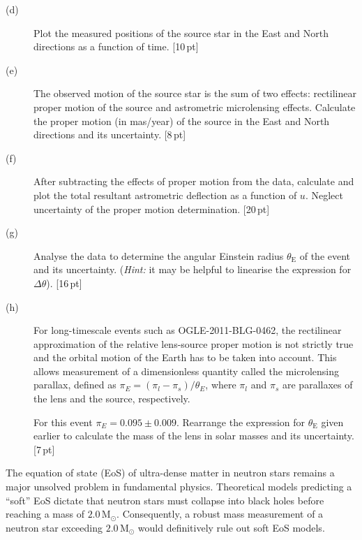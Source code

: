 \begin{description}
\item[(d)] Plot the measured positions of the source star in the East and
  North directions as a function of time. \hfill[10\,pt]
\item[(e)] The observed motion of the source star is the sum of two effects:
  rectilinear proper motion of the source and astrometric microlensing
  effects. Calculate the proper motion (in mas/year) of the source in the East
  and North directions and its uncertainty. \hfill[8\,pt]
\item[(f)] After subtracting the effects of proper motion from the data,
  calculate and plot the total resultant astrometric deflection as a function
  of $u$. Neglect uncertainty of the proper motion determination.
  \hfill[20\,pt]
\item[(g)] Analyse the data to determine the angular Einstein radius
  $\theta_{\mathrm{E}}$ of the event and its uncertainty. (\textit{Hint:} it
  may be helpful to linearise the expression for $\Delta\theta$).
  \hfill[16\,pt]
\item[(h)] For long-timescale events such as OGLE-2011-BLG-0462, the
  rectilinear approximation of the relative lens-source proper motion is not
  strictly true and the orbital motion of the Earth has to be taken into
  account. This allows measurement of a dimensionless quantity called the
  microlensing parallax, defined as
  $\pi_E = (\pi_l - \pi_s)/\theta_E$, where $\pi_l$ and $\pi_s$ are parallaxes
  of the lens and the source, respectively.

  For this event $\pi_E = 0.095 \pm 0.009$. Rearrange the expression for
  $\theta_{\mathrm{E}}$ given earlier to calculate the mass of the lens in
  solar masses and its uncertainty. \hfill[7\,pt]
\end{description}


The equation of state (EoS) of ultra-dense matter in neutron stars remains a
major unsolved problem in fundamental physics. Theoretical models predicting a
``soft'' EoS dictate that neutron stars must collapse into black holes before
reaching a mass of $2.0\,\mathrm{M}_\odot$. Consequently, a robust mass
measurement of a neutron star exceeding $2.0\,\mathrm{M}_\odot$ would
definitively rule out soft EoS models.

